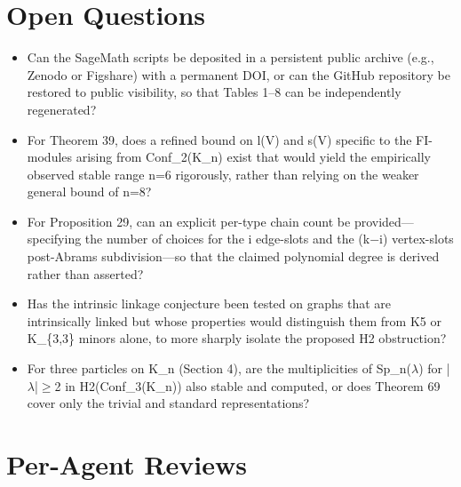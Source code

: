 \documentclass[11pt]{article}
\begin{document}
\section*{Open Questions}
\begin{itemize}[leftmargin=*]
  \item Can the SageMath scripts be deposited in a persistent public archive (e.g., Zenodo or Figshare) with a permanent DOI, or can the GitHub repository be restored to public visibility, so that Tables 1--8 can be independently regenerated?
  \item For Theorem 39, does a refined bound on l(V) and s(V) specific to the FI-modules arising from Conf\_2(K\_n) exist that would yield the empirically observed stable range n=6 rigorously, rather than relying on the weaker general bound of n=8?
  \item For Proposition 29, can an explicit per-type chain count be provided---specifying the number of choices for the i edge-slots and the (k\ensuremath{-}i) vertex-slots post-Abrams subdivision---so that the claimed polynomial degree is derived rather than asserted?
  \item Has the intrinsic linkage conjecture been tested on graphs that are intrinsically linked but whose properties would distinguish them from K5 or K\_\{3,3\} minors alone, to more sharply isolate the proposed H2 obstruction?
  \item For three particles on K\_n (Section 4), are the multiplicities of Sp\_n(\ensuremath{\lambda}) for |\ensuremath{\lambda}|\ensuremath{\ge}2 in H2(Conf\_3(K\_n)) also stable and computed, or does Theorem 69 cover only the trivial and standard representations?
\end{itemize}

\section*{Per-Agent Reviews}
\end{document}
